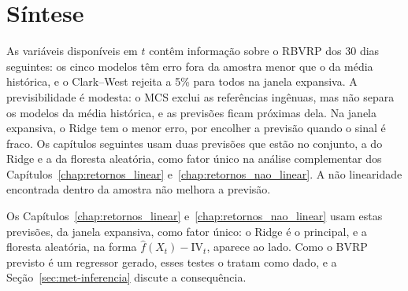 \section{Síntese}
\label{sec:prev-sintese}

As variáveis disponíveis em $t$ contêm informação sobre o RBVRP dos 30 dias
seguintes: os cinco modelos têm erro fora da amostra menor que o da média
histórica, e o Clark--West rejeita a 5\% para todos na janela expansiva. A
previsibilidade é modesta: o MCS exclui as referências ingênuas, mas não separa
os modelos da média histórica, e as previsões ficam próximas dela. Na janela
expansiva, o Ridge tem o menor erro, por encolher a previsão quando o sinal é
fraco. Os capítulos
seguintes usam duas previsões que estão no conjunto, a do Ridge e a da
floresta aleatória, como fator único na análise complementar dos
Capítulos~\ref{chap:retornos_linear} e~\ref{chap:retornos_nao_linear}. A não linearidade encontrada dentro da
amostra não melhora a previsão.

Os Capítulos~\ref{chap:retornos_linear} e~\ref{chap:retornos_nao_linear} usam
estas previsões, da janela expansiva, como fator único: o Ridge é o principal,
e a floresta aleatória, na forma $\hat f(X_t) - \text{IV}_t$, aparece ao lado.
Como o BVRP previsto é um regressor gerado, esses testes o tratam como dado, e
a Seção~\ref{sec:met-inferencia} discute a consequência.

